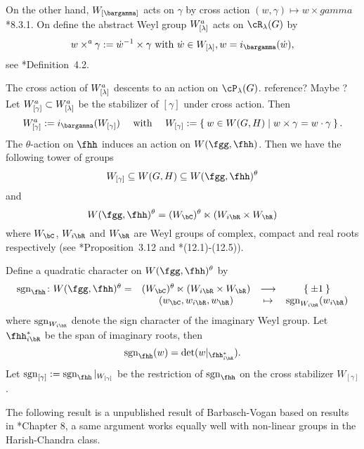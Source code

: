 \documentclass[counting_main.tex]{subfiles}
\begin{document}
On the other hand, $W_{[\bargamma]}$ acts on $\gamma$ by cross action
$(w,\gamma)\mapsto w\times gamma$ \cite{Vg}*{8.3.1}. On define the abstract Weyl
group $W^a_{[\lambda]}$ acts on $\cR_{\lambda}(G)$ by
\[
  w \crossa \gamma := \dot{w}^{-1}\times \gamma \text{ with
  } \dot{w}\in W_{[\lambda]}, w = i_{\bargamma}(\dot{w}),
\]
see \cite{V4}*{Definition~4.2}.

The cross action of $W^a_{[\lambda]}$ descents to an action on $\cP_{\lambda}(G)$.
{\color{red} reference? Maybe \cite{V4}?} Let $W^{a}_{[\gamma]}\subset W^a_{[\lambda]}$ be the stabilizer of
$[\gamma]$ under cross action. Then
\[
  \Wa_{[\gamma]}:= i_{\bargamma}(W_{[\gamma]})
  \quad \text{ with }\quad
  W_{[\gamma]}:=\Set{w\in W(G,H)| w\times \gamma = w\cdot \gamma}.
\]
The $\theta$-action on $\fhh$ induces an action on $W(\fgg,\fhh)$. Then we have
the following tower of groups
\[
  W_{[\gamma]} \subseteq W(G,H) \subseteq W(\fgg,\fhh)^{\theta}
\]
and
\[
  W(\fgg,\fhh)^{\theta}=(\WC)^{\theta}\ltimes (\WiR\times \WR)
\]
where $\WC$, $\WiR$ and $\WR$ are Weyl groups of complex, compact and real
roots respectively (see \cite{V4}*{Proposition~3.12} and
\cite{AC}*{(12.1)-(12.5)}).


Define a quadratic character on $W(\fgg,\fhh)^{\theta}$ by
\[
  \begin{array}{rccc}
    \sgn_{\fhh}\colon  W(\fgg,\fhh)^{\theta} =
    & (\WC)^{\theta}\ltimes (\WiR\times \WR)
    & \longrightarrow & \Set{\pm 1}\\
    & (w_{\bC},w_{i\bR},w_{\bR}) & \mapsto & \sgn_{\WiR}(w_{i\bR})
  \end{array}
\]
where $\sgn_{\WiR}$ denote the sign character of the imaginary Weyl group. Let
$\fhhiR^{*}$ be the span of imaginary roots, then
\[
  \sgn_{\fhh}(w) = \det(w|_{\fhhiR^{*}}).
\]
Let $\sgn_{[\gamma]}:=\sgn_{\fhh}|_{W_{[\gamma]}}$ be the restriction of
$\sgn_{\fhh}$ on the cross stabilizer $W_{[\gamma]}$.

The following result is a unpublished result of Barbasch-Vogan based on results
in \cite{Vg}*{Chapter 8}, a same argument works equally well with non-linear groups
in the Harish-Chandra class.
\end{document}
